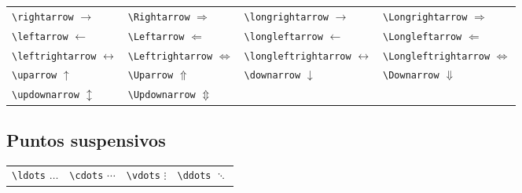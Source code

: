 \documentclass[
  spanish,
  a4paper,
]{scrreport}
\newcounter{none} %
\theoremstyle{definition}
\theoremstyle{remark}
\begin{document}
{\def\LTcaptype{none} %
\begin{longtable}[]{@{}
  >{\raggedright\arraybackslash}p{}
  >{\raggedright\arraybackslash}p{}
  >{\raggedright\arraybackslash}p{}
  >{\raggedright\arraybackslash}p{}@{}}
\toprule\noalign{}
\endhead
\bottomrule\noalign{}
\endlastfoot
\texttt{\textbackslash{}rightarrow} \(\to\) &
\texttt{\textbackslash{}Rightarrow} \(\Rightarrow\) &
\texttt{\textbackslash{}longrightarrow} \(\longrightarrow\) &
\texttt{\textbackslash{}Longrightarrow} \(\Longrightarrow\) \\
\texttt{\textbackslash{}leftarrow} \(\leftarrow\) &
\texttt{\textbackslash{}Leftarrow} \(\Leftarrow\) &
\texttt{\textbackslash{}longleftarrow} \(\longleftarrow\) &
\texttt{\textbackslash{}Longleftarrow} \(\Longleftarrow\) \\
\texttt{\textbackslash{}leftrightarrow} \(\leftrightarrow\) &
\texttt{\textbackslash{}Leftrightarrow} \(\Leftrightarrow\) &
\texttt{\textbackslash{}longleftrightarrow} \(\longleftrightarrow\) &
\texttt{\textbackslash{}Longleftrightarrow} \(\Longleftrightarrow\) \\
\texttt{\textbackslash{}uparrow} \(\uparrow\) &
\texttt{\textbackslash{}Uparrow} \(\Uparrow\) &
\texttt{\textbackslash{}downarrow} \(\downarrow\) &
\texttt{\textbackslash{}Downarrow} \(\Downarrow\) \\
\texttt{\textbackslash{}updownarrow} \(\updownarrow\) &
\texttt{\textbackslash{}Updownarrow} \(\Updownarrow\) & & \\
\end{longtable}
}

\subsection{Puntos suspensivos}\label{puntos-suspensivos}

{\def\LTcaptype{none} %
\begin{longtable}[]{@{}
  >{\raggedright\arraybackslash}p{}
  >{\raggedright\arraybackslash}p{}
  >{\raggedright\arraybackslash}p{}
  >{\raggedright\arraybackslash}p{}@{}}
\toprule\noalign{}
\endhead
\bottomrule\noalign{}
\endlastfoot
\texttt{\textbackslash{}ldots} \(\ldots\) &
\texttt{\textbackslash{}cdots} \(\cdots\) &
\texttt{\textbackslash{}vdots} \(\vdots\) &
\texttt{\textbackslash{}ddots} \(\ddots\) \\
\end{longtable}
}
\end{document}
